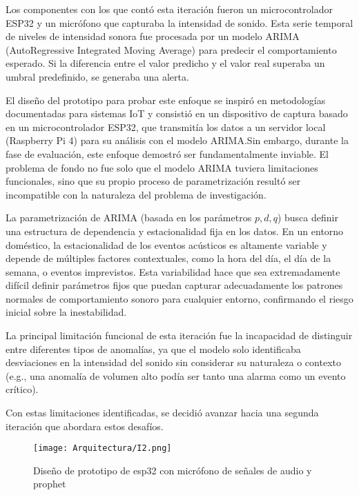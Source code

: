Los componentes con los que contó esta iteración fueron un microcontrolador ESP32 y un micrófono que capturaba la intensidad de sonido. Esta serie temporal de niveles de intensidad sonora fue procesada por un modelo ARIMA (AutoRegressive Integrated Moving Average) para predecir el comportamiento esperado. Si la diferencia entre el valor predicho y el valor real superaba un umbral predefinido, se generaba una alerta.

El diseño del prototipo para probar este enfoque se inspiró en metodologías documentadas para sistemas IoT \cite{luis2024desarrollo} y consistió en un dispositivo de captura basado en un microcontrolador ESP32, que transmitía los datos a un servidor local (Raspberry Pi 4) para su análisis con el modelo ARIMA.Sin embargo, durante la fase de evaluación, este enfoque demostró ser fundamentalmente inviable. El problema de fondo no fue solo que el modelo ARIMA tuviera limitaciones funcionales, sino que su propio proceso de parametrización resultó ser incompatible con la naturaleza del problema de investigación.

La parametrización de ARIMA (basada en los parámetros $p, d, q$) busca definir una estructura de dependencia y estacionalidad fija en los datos. En un entorno doméstico, la estacionalidad de los eventos acústicos es altamente variable y depende de múltiples factores contextuales, como la hora del día, el día de la semana, o eventos imprevistos. Esta variabilidad hace que sea extremadamente difícil definir parámetros fijos que puedan capturar adecuadamente los patrones normales de comportamiento sonoro para cualquier entorno, confirmando el riesgo inicial sobre la inestabilidad.

La principal limitación funcional de esta iteración fue la incapacidad de distinguir entre diferentes tipos de anomalías, ya que el modelo solo identificaba desviaciones en la intensidad del sonido sin considerar su naturaleza o contexto (e.g., una anomalía de volumen alto podía ser tanto una alarma como un evento crítico).

Con estas limitaciones identificadas, se decidió avanzar hacia una segunda iteración que abordara estos desafíos.


      \begin{figure}[ht!]
            \centering
            \texttt{[image: Arquitectura/I2.png]}
            \caption{Diseño de prototipo de esp32 con micrófono de señales de audio y prophet}
            \label{fig:prototipo2}
      \end{figure}

